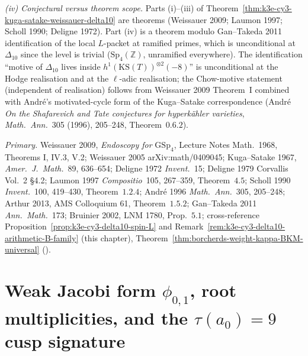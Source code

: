 \begin{remark}
\emph{(iv) Conjectural versus theorem scope.} Parts (i)--(iii) of Theorem~\ref{thm:k3e-cy3-kuga-satake-weissauer-delta10} are theorems \textup{(}Weissauer 2009; Laumon 1997; Scholl 1990; Deligne 1972\textup{)}. Part (iv) is a theorem modulo Gan--Takeda 2011 identification of the local $L$-packet at ramified primes, which is unconditional at $\Delta_{10}$ since the level is trivial ($\mathrm{Sp}_4(\mathbb Z)$, unramified everywhere). The identification ``motive of $\Delta_{10}$ lives inside $h^1(\mathrm{KS}(T))^{\otimes 2}(-8)$'' is unconditional at the Hodge realisation and at the $\ell$-adic realisation; the Chow-motive statement (independent of realisation) follows from Weissauer 2009 Theorem~I combined with Andr\'e's motivated-cycle form of the Kuga--Satake correspondence \textup{(}Andr\'e \emph{On the Shafarevich and Tate conjectures for hyperk\"ahler varieties}, \emph{Math.\ Ann.}\ 305 (1996), 205--248, Theorem~$0.6.2$\textup{)}.

\emph{Primary.}
Weissauer 2009, \emph{Endoscopy for} $\mathrm{GSp}_4$, Lecture Notes Math.\ 1968, Theorems I, IV.3, V.2;
Weissauer 2005 arXiv:math/0409045;
Kuga--Satake 1967, \emph{Amer.\ J.\ Math.}\ 89, 636--654;
Deligne 1972 \emph{Invent.}\ 15;
Deligne 1979 Corvallis Vol.\ 2 \S 4.2;
Laumon 1997 \emph{Compositio}\ 105, 267--359, Theorem~$4.5$;
Scholl 1990 \emph{Invent.}\ 100, 419--430, Theorem~$1.2.4$;
Andr\'e 1996 \emph{Math.\ Ann.}\ 305, 205--248;
Arthur 2013, AMS Colloquium 61, Theorem~$1.5.2$;
Gan--Takeda 2011 \emph{Ann.\ Math.}\ 173;
Bruinier 2002, LNM 1780, Prop.~$5.1$;
cross-reference Proposition~\ref{prop:k3e-cy3-delta10-spin-L} and Remark~\ref{rem:k3e-cy3-delta10-arithmetic-B-family} (this chapter), Theorem~\ref{thm:borcherds-weight-kappa-BKM-universal} (\cite{VolI}).
\end{remark}

\section{Weak Jacobi form \texorpdfstring{$\phi_{0,1}$}{phi-0,1}, root multiplicities, and the \texorpdfstring{$\tau(a_0)=9$}{tau(a-0)=9} cusp signature}
\label{sec:k3e-cy3-phi01-tau9-multiplicities}

